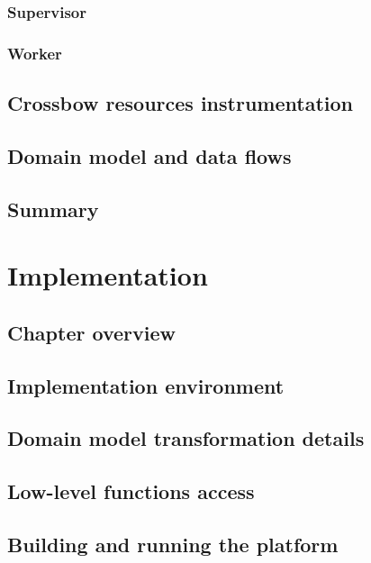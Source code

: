 \documentclass[11pt]{book}
\begin{document}
      \subsection{Supervisor}

      \subsection{Worker}


    \section{Crossbow resources instrumentation}


    \section{Domain model and data flows}


    \section*{Summary}


  \chapter{Implementation}
    
    \section*{Chapter overview}


    \section{Implementation environment}


    \section{Domain model transformation details}


    \section{Low-level functions access}


    \section{Building and running the platform}
\end{document}
